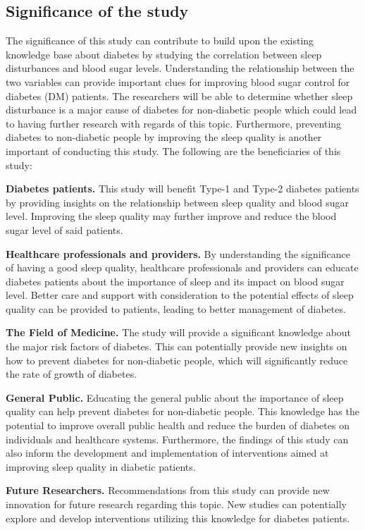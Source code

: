 \subsection*{Significance of the study}
The significance of this study can contribute to build upon the existing
knowledge base about diabetes by studying the correlation between sleep
disturbances and blood sugar levels. Understanding the relationship between the
two variables can provide important clues for improving blood sugar control for
diabetes (DM) patients. The researchers will be able to determine whether sleep
disturbance is a major cause of diabetes for non-diabetic people which could
lead to having further research with regards of this topic. Furthermore,
preventing diabetes to non-diabetic people by improving the sleep quality is
another important of conducting this study. The following are the beneficiaries
of this study:

\textbf{Diabetes patients.} This study will benefit Type-1 and Type-2 diabetes
patients by providing insights on the relationship between sleep quality and
blood sugar level. Improving the sleep quality may further improve and reduce
the blood sugar level of said patients.

\textbf{Healthcare professionals and providers.} By understanding the
significance of having a good sleep quality, healthcare professionals and
providers can educate diabetes patients about the importance of sleep and its
impact on blood sugar level. Better care and support with consideration to the
potential effects of sleep quality can be provided to patients, leading to
better management of diabetes.

\textbf{The Field of Medicine.} The study will provide a significant knowledge
about the major risk factors of diabetes. This can potentially provide new
insights on how to prevent diabetes for non-diabetic people, which will
significantly reduce the rate of growth of diabetes.

\textbf{General Public.} Educating the general public about the importance of
sleep quality can help prevent diabetes for non-diabetic people. This knowledge
has the potential to improve overall public health and reduce the burden of
diabetes on individuals and healthcare systems. Furthermore, the findings of
this study can also inform the development and implementation of interventions
aimed at improving sleep quality in diabetic patients.

\textbf{Future Researchers.} Recommendations from this study can provide new
innovation for future research regarding this topic. New studies can potentially
explore and develop interventions utilizing this knowledge for diabetes
patients.
